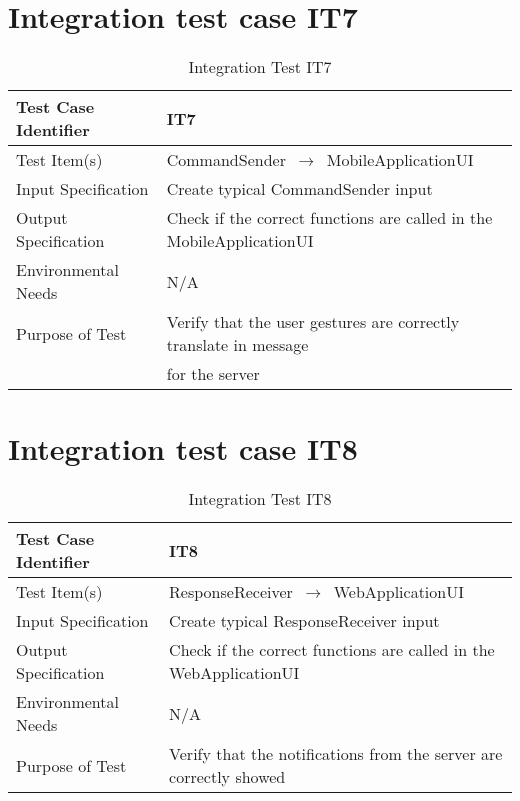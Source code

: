 \documentclass[../../testPlan.tex]{subfiles}
\begin{document}
	\section{Integration test case IT7}
		\begin{table}[H]
			\centering
			\label{IT7}
			\begin{tabular}{ll}
				\hline
				Test Case Identifier & IT7  \\ \hline
				Test Item(s)         & CommandSender $\,\to\,$ MobileApplicationUI\\ \hline
				Input Specification  & Create typical CommandSender input  \\ \hline
				Output Specification & Check if the correct functions are called in the MobileApplicationUI\\ \hline
				Environmental Needs  &  N/A \\ \hline
				Purpose of Test      &  Verify that the user gestures are correctly translate in message \\ & for the server  \\ \hline
			\end{tabular}
			\caption{Integration Test IT7}
		\end{table}
		
		
	\section{Integration test case IT8}
		\begin{table}[H]
			\centering
			\label{IT8}
			\begin{tabular}{ll}
				\hline
				Test Case Identifier & IT8  \\ \hline
				Test Item(s)         & ResponseReceiver $\,\to\,$ WebApplicationUI\\ \hline
				Input Specification  & Create typical ResponseReceiver input  \\ \hline
				Output Specification & Check if the correct functions are called in the WebApplicationUI\\ \hline
				Environmental Needs  &  N/A \\ \hline
				Purpose of Test      &  Verify that the notifications from the server are correctly showed\\ \hline
			\end{tabular}
			\caption{Integration Test IT8}
		\end{table}
		
		
\end{document}
